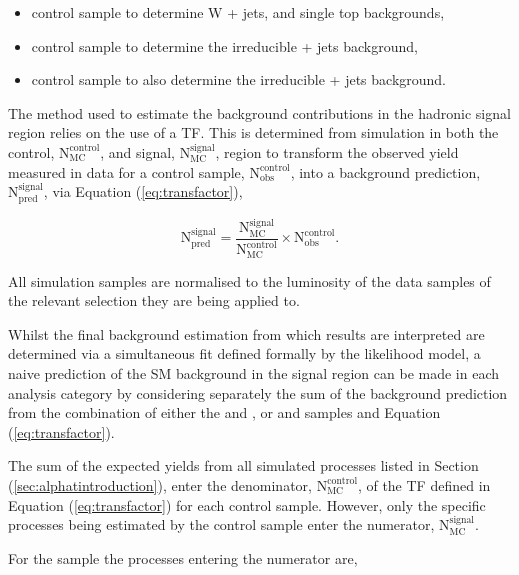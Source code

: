 \begin{itemize}
\item \mupjets control sample to determine W + jets, \ttbar and single top backgrounds,
\item \gpjets control sample to determine the irreducible \zinv + jets background,
\item \dimupjets control sample to also determine the irreducible \zinv + jets background.
\end{itemize}

The method used to estimate the background contributions in the hadronic signal region relies on the use of a \acf{TF}. This is determined from simulation in both the control, $\text{N}_{\text{MC}}^{\text{control}}$, and signal, $\text{N}_{\text{MC}}^{\text{signal}}$, region to transform the observed yield measured in data for a control sample,  $\text{N}_{\text{obs}}^{\text{control}}$, into a background prediction, $\text{N}_{\text{pred}}^{\text{signal}}$, via Equation (\ref{eq:transfactor}),

\begin{equation}
\label{eq:transfactor}
\text{N}_{\text{pred}}^{\text{signal}} = \frac{\text{N}_{\text{MC}}^{\text{signal}}}{ \text{N}_{\text{MC}}^{\text{control}}} \times  \text{N}_{\text{obs}}^{\text{control}}.
\end{equation}

All simulation samples are normalised to the luminosity of the data samples of the relevant selection they are being applied to. 

Whilst the final background estimation from which results are interpreted are determined via a simultaneous fit defined formally by the likelihood model, a naive prediction of the \ac{SM} background in the signal region can be made in each analysis category by considering separately the sum of the background prediction from the combination of either the \mupjets and \gpjets, or \mupjets and \dimupjets samples and Equation (\ref{eq:transfactor}). 

The sum of the expected yields from all simulated processes listed in Section (\ref{sec:alphatintroduction}), enter the denominator, $\text{N}_{\text{MC}}^{\text{control}}$, of the \ac{TF} defined in Equation (\ref{eq:transfactor}) for each control sample. However, only the specific processes being estimated by the control sample enter the numerator, $\text{N}_{\text{MC}}^{\text{signal}}$.

For the \mupjets sample the processes entering the numerator are,


